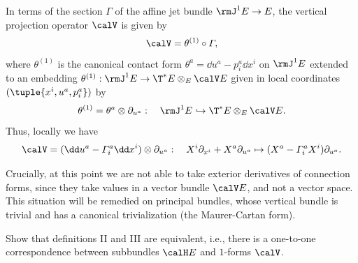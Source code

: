 \begin{rem}\label{rem connections via jets 2}
    In terms of the section $\varGamma$ of the affine jet bundle $\rmJ^1 E\to E$, the vertical projection operator $\calV$ is given by 
    \[\calV=\theta^{(1)}\circ\varGamma,\]
    where $\theta^{(1)}$ is the canonical contact form $\theta^a=\dd u^a-p^a_i\dd x^i$ on $\rmJ^1 E$ extended to an embedding $\theta^{(1)}:\rmJ^1 E\to \T^\ast E\otimes_E \calV E$ given in local coordinates $(\tuple{x^i,u^a,p^a_i})$ by 
    \[\theta^{(1)}=\theta^a\otimes \partial_{u^a}:\quad \rmJ^1 E\hookrightarrow \T^\ast E\otimes_E \calV E.\] 
    Thus, locally we have 
    \[\calV=(\dd u^a-\varGamma^a_i\dd x^i)\otimes \partial_{u^a}:\quad X^i\partial_{x^i}+X^a\partial_{u^a}\mapsto (X^a-\varGamma^a_i X^i)\partial_{u^a}.\]
\end{rem}

\begin{rem}
    Crucially, at this point we are not able to take exterior derivatives of connection forms, since they take values in a vector bundle $\calV E$, and not a vector space. This situation will be remedied on principal bundles, whose vertical bundle is trivial and has a canonical trivialization (the Maurer-Cartan form).
\end{rem}

\begin{xca}
    Show that definitions II and III are equivalent, i.e., there is a one-to-one correspondence between subbundles $\calH E$ and $1$-forms $\calV$.
\end{xca}


